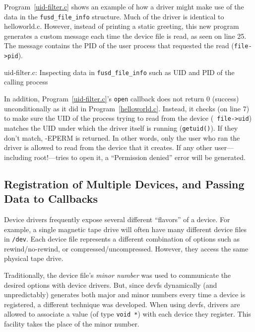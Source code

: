 \documentclass{article}
\begin{document}
Program~\ref{uid-filter.c} shows an example of how a driver might make
use of the data in the {\tt fusd\_file\_info} structure.  Much of the
driver is identical to helloworld.c.  However, instead of printing a
static greeting, this new program generates a custom message each time
the device file is read, as seen on line 25.  The message contains the
PID of the user process that requested the read ({\tt file->pid}).

\begin{Program}
\caption{uid-filter.c: Inspecting data in {\tt fusd\_file\_info} such
as UID and PID of the calling process}
\label{uid-filter.c}
\end{Program}

In addition, Program~\ref{uid-filter.c}'s {\tt open} callback does not
return 0 (success) unconditionally as it did in
Program~\ref{helloworld.c}.  Instead, it checks (on line 7) to make
sure the UID of the process trying to read from the device ({\tt
file->uid}) matches the UID under which the driver itself is running
({\tt getuid()}).  If they don't match, -EPERM is returned.  In other
words, only the user who ran the driver is allowed to read from the
device that it creates.  If any other user---including root!---tries
to open it, a ``Permission denied'' error will be generated.


\subsection{Registration of Multiple Devices, and Passing Data to Callbacks}

\label{device-info}

Device drivers frequently expose several different ``flavors'' of a
device.  For example, a single magnetic tape drive will often have
many different device files in {\tt /dev}.  Each device file
represents a different combination of options such as
rewind/no-rewind, or compressed/uncompressed.  However, they access
the same physical tape drive.

Traditionally, the device file's {\em minor number} was used to
communicate the desired options with device drivers.  But, since devfs
dynamically (and unpredictably) generates both major and minor numbers
every time a device is registered, a different technique was
developed.  When using devfs, drivers are allowed to associate a value
(of type {\tt void *}) with each device they register.  This facility
takes the place of the minor number.
\end{document}
